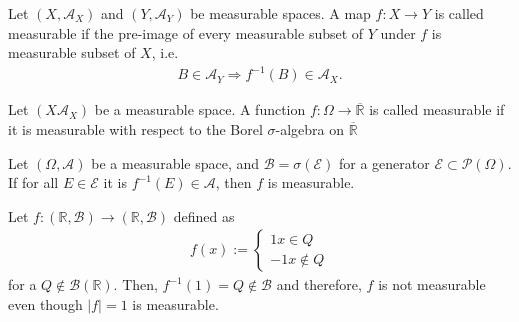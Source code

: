 \begin{definition}
    Let \((X, \mathcal{A}_X)\) and \((Y, \mathcal{A}_Y)\) be measurable spaces. A map \(f: X \rightarrow Y\) is called measurable if the pre-image of every measurable subset of \(Y\) under \(f\) is measurable subset of \(X\), i.e.
        \begin{align}
            B \in \mathcal{A}_Y \Rightarrow f^{-1}(B) \in \mathcal{A}_X \text{.}
        \end{align}
\end{definition}
%
%
%
%
%
\begin{definition}
    Let \((X \mathcal{A}_X)\) be a measurable space. A function \(f: \Omega \rightarrow \overline{\mathbb{R}}\) is called measurable if it is measurable with respect to the Borel \(\sigma\)-algebra on \(\overline{\mathbb{R}}\)
\end{definition}
%
%
%
%
%
%
\begin{definition}
    
\end{definition}
%
%
%
%
%
\begin{theorem}
    Let \((\Omega, \mathcal{A})\) be a measurable space, and \(\mathcal{B} = \sigma(\mathcal{E})\) for a generator \(\mathcal{E} \subset \mathcal{P}(\Omega)\). If for all \(E \in \mathcal{E}\) it is \(f^{-1}(E) \in \mathcal{A}\), then \(f\) is measurable.
\end{theorem}
\begin{example}
    Let \(f:(\mathbb{R}, \mathcal{B}) \rightarrow (\mathbb{R}, \mathcal{B})\) defined as
    \begin{align}
        f(x) := \begin{cases}
            1 x \in Q \\
            -1 x \notin Q
        \end{cases}
    \end{align}
    for a \(Q \notin \mathcal{B}(\mathbb{R})\). Then, \(f^{-1}({1})=Q \notin \mathcal{B}\) and therefore, \(f\) is not measurable even though \(|f| = 1\) is measurable.
\end{example}